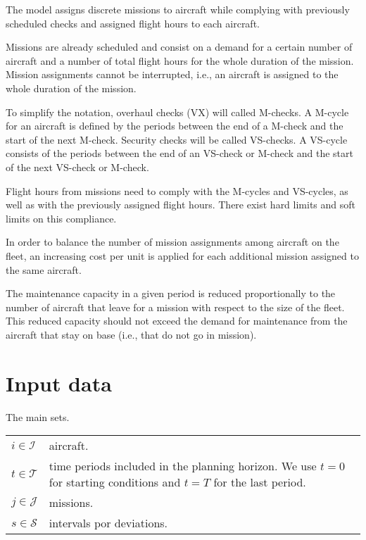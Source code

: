 
The model assigns discrete missions to aircraft while complying with previously scheduled checks and assigned flight hours to each aircraft.

Missions are already scheduled and consist on a demand for a certain number of aircraft and a number of total flight hours for the whole duration of the mission. Mission assignments cannot be interrupted, i.e., an aircraft is assigned to the whole duration of the mission.

To simplify the notation, overhaul checks (VX) will called M-checks. A M-cycle for an aircraft is defined by the periods between the end of a M-check and the start of the next M-check. Security checks will be called VS-checks. A VS-cycle consists of the periods between the end of an VS-check or M-check and the start of the next VS-check or M-check.

Flight hours from missions need to comply with the M-cycles and VS-cycles, as well as with the previously assigned flight hours. There exist hard limits and soft limits on this compliance.

In order to balance the number of mission assignments among aircraft on the fleet, an increasing cost per unit is applied for each additional mission assigned to the same aircraft.

The maintenance capacity in a given period is reduced proportionally to the number of aircraft that leave for a mission with respect to the size of the fleet. This reduced capacity should not exceed the demand for maintenance from the aircraft that stay on base (i.e., that do not go in mission).


\section{Input data}

The main sets.

  \begin{tabular}{p{20mm}p{120mm}}
    $i \in \mathcal{I}$     &  aircraft.    \\
    $t \in \mathcal{T}$     &  time periods included in the planning horizon. We use $t=0$ for starting conditions and $t=T$ for the last period. \\
    $j \in \mathcal{J}$     &  missions. \\
    $s \in \mathcal{S}$     &  intervals por deviations.
  \end{tabular}

